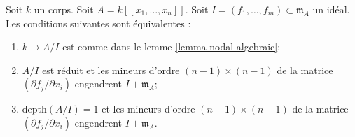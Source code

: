 \begin{lemma}
\label{lemma-fitting-ideal}
Soit $k$ un corps. Soit $A = k[[x_1, \ldots, x_n]]$. Soit $I = (f_1, \ldots, f_m) \subset \mathfrak m_A$ un idéal. Les conditions suivantes sont équivalentes : \begin{enumerate} \item $k \to A/I$ est comme dans le lemme \ref{lemma-nodal-algebraic}; \item $A/I$ est réduit et les mineurs d'ordre $(n - 1) \times (n - 1)$ de la matrice $(\partial f_j/\partial x_i)$ engendrent $I + \mathfrak m_A$; \item $\text{depth}(A/I) = 1$ et les mineurs d'ordre $(n - 1) \times (n - 1)$ de la matrice $(\partial f_j/\partial x_i)$ engendrent $I + \mathfrak m_A$.
\end{enumerate}
\end{lemma}

